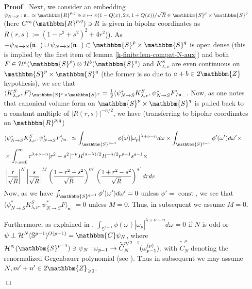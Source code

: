 \documentclass{article}
\newcommand{\assign}{:=}
\newcommand{\tmop}[1]{\ensuremath{\operatorname{#1}}}
\newenvironment{proof}{\noindent\textbf{Proof\ }}{\hspace*{\fill}$\Box$\medskip}
\begin{document}
\begin{proof}
  Next, we consider an embedding $\psi_{N \rightarrow S} : \mathfrak{n}_-
  \simeq \mathbbm{R}^{p, q} \ni x \mapsto \pi (1 - Q (x), 2 x, 1 + Q (x)) /
  \sqrt{R} \in \mathbbm{S}^p \times \mathbbm{S}^q$ (here $C^{\infty}
  (\mathbbm{R}^{p, q}) \ni R$ is given in bipolar coordinates as $R (r, s)
  \assign (1 - r^2 + s^2)^2 + 4 r^2$)). As $- \psi_{N \xrightarrow{} S}
  (\mathfrak{n}_-) \cup \psi_{N \xrightarrow{} S} (\mathfrak{n}_-) \subset
  \mathbbm{S}^p \times \mathbbm{S}^q$ is open dense (this is implied by the
  first item of lemma \ref{k-finite:lem-compat-N-aux}) and both $F \in
  \mathcal{H}^a (\mathbbm{S}^p) \otimes \mathcal{H}^b (\mathbbm{S}^q)$ and
  $K_{\lambda, \nu}^S$ are even continuous on $\mathbbm{S}^p \times
  \mathbbm{S}^q$ (the former is so due to $a + b \in 2\mathbbm{Z}$
  hypothesis), we see that $\langle K_{\lambda, \nu}^S, F
  \rangle_{\mathbbm{S}^p \times \mathbbm{S}^q} = \frac{1}{2} \langle \psi_{N
  \rightarrow S}^{\ast} K_{\lambda, \nu}^S, \psi_{N \rightarrow S}^{\ast} F
  \rangle_{\mathfrak{n}_-}$. Now, as one notes that canonical volume form on
  $\mathbbm{S}^p \times \mathbbm{S}^q$ is pulled back to a constant multiple
  of $| R (r, s) |^{- n / 2}$, we have (transferring to bipolar coordinates on
  $\mathbbm{R}^{p, q}$)
  \begin{eqnarray}
    & \langle \psi_{N \rightarrow S}^{\ast} K_{\lambda, \nu}^S, \psi_{N
    \rightarrow S}^{\ast} F \rangle_{\mathfrak{n}_-} \simeq
    \int_{\mathbbm{S}^{p - 1}} \phi (\omega) | \omega_p |^{\lambda + \nu - n}
    d \omega_{} \times \int_{\mathbbm{S}^{q - 1}} \phi' (\omega') d \omega'
    \times &  \nonumber\\
    & \times \int_{r, s = 0}^{\infty} r^{\lambda + \nu - n} | r^2 - s^2 |^{-
    \nu} R^{(n - \lambda) / 2} R^{- n / 2} r^{p - 1} s^{q - 1} \times & 
    \nonumber\\
    & \left| \frac{r}{\sqrt{R}} \right|^N \left| \frac{s}{\sqrt{R}} \right|^M
    \left( \frac{1 - r^2 + s^2}{\sqrt{R}} \right)^{m'} \left( \frac{1 + r^2 -
    s^2}{\sqrt{R}} \right)^{n'} d r d s &  \nonumber
  \end{eqnarray}
  Now, as we have $\int_{\mathbbm{S}^{q - 1}} \phi' (\omega') d \omega' = 0$
  unless $\phi' = \tmop{const}$, we see that $\langle \psi_{N \rightarrow
  S}^{\ast} K_{\lambda, \nu}^S, \psi_{N \rightarrow S}^{\ast} F
  \rangle_{\mathfrak{n}_-} = 0$ unless $M = 0$. Thus, in subsequent we assume
  $M = 0$.
  
  Furthermore, as explained in {\cite[lem 7.6]{kobayashi2015symmetry}},
  $\int_{\mathbb{S}^{p - 1}} \phi (\omega_{}) | \omega_p^{} |^{\lambda + \nu -
  n} d \omega_{} = 0$ if $N$ is odd or $\psi \perp \mathcal{H}^N
  (\mathbb{S}^{p - 1})^{O (p - 1)} =\mathbbm{C} \psi_N$, where $\mathcal{H}^N
  (\mathbbm{S}^{p - 1}) \ni \psi_N : \omega_{p - 1} \rightarrow
  \widetilde{\tilde{C}}_N^{p / 2 - 1} (\omega_{p - 1}^{(p)})$, with
  $\widetilde{\tilde{C}}_N^{\mu}$ denoting the renormalized Gegenbauer
  polynomial (see {\cite[(16.4)]{kobayashi2015symmetry}}). Thus in subsequent
  we may assume $N, m' + n' \in 2\mathbbm{Z}_{\geqslant 0}$.
  

\end{proof}
\end{document}
